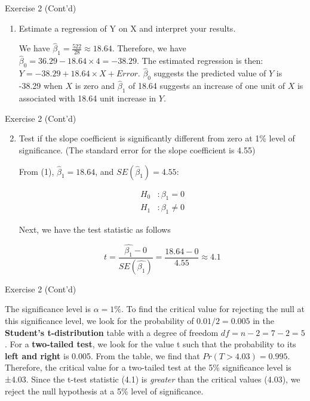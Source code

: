 \documentclass[
  ignorenonframetext,
  aspectratio=43,
]{beamer}
\let\olditem\item
\renewcommand\item{\olditem\justifying}
\begin{document}
\begin{frame}{Exercise 2 (Cont'd)}
\protect\hypertarget{exercise-2-contd}{}
\begin{enumerate}
\item
  Estimate a regression of Y on X and interpret your results.

  \pause

  We have \(\hat{\beta}_1 = \frac{522}{28} \approx 18.64\). Therefore,
  we have \(\hat{\beta}_0 = 36.29 - 18.64 \times 4 = -38.29\). The
  estimated regression is then: \(Y = -38.29 + 18.64 \times X + Error\).
  \(\hat{\beta}_0\) suggests the predicted value of \(Y\) is -38.29 when
  \(X\) is zero and \(\hat{\beta}_1\) of 18.64 suggests an increase of
  one unit of \(X\) is associated with 18.64 unit increase in \(Y\).
\end{enumerate}
\end{frame}

\begin{frame}{Exercise 2 (Cont'd)}
\protect\hypertarget{exercise-2-contd-1}{}
\begin{enumerate}
\setcounter{enumi}{1}
\item
  Test if the slope coefficient is significantly different from zero at
  1\% level of significance. (The standard error for the slope
  coefficient is 4.55)

  \pause

  From (1), \(\hat{\beta}_1 = 18.64\), and \(SE(\hat{\beta}_1) = 4.55\):

  \pause

  \[
   \begin{aligned}
   H_0 &: \beta_1 = 0 \\
   H_1 &: \beta_1 \neq 0
   \end{aligned}
   \]

  \pause

  Next, we have the test statistic as follows

  \pause

  \[
   t = \frac{\hat{\beta_1} - 0}{SE(\hat{\beta_1})} = \frac{18.64 - 0}{4.55} \approx 4.1
   \]
\end{enumerate}
\end{frame}

\begin{frame}{Exercise 2 (Cont'd)}
\protect\hypertarget{exercise-2-contd-2}{}
\pause

The significance level is \(\alpha=1\%\). To find the critical value for
rejecting the null at this significance level, we look for the
probability of \(0.01/2=0.005\) in the \textbf{Student's t-distribution}
table with a degree of freedom \(df=n-2=7-2=5\). For a
\textbf{two-tailed test}, we look for the value t such that the
probability to its \textbf{left and right} is 0.005. From the table, we
find that \(Pr(T>4.03)= 0.995\). Therefore, the critical value for a
two-tailed test at the 5\% significance level is ±4.03. Since the t-test
statistic (4.1) is \emph{greater} than the critical values (4.03), we
reject the null hypothesis at a 5\% level of significance.
\end{frame}
\end{document}
